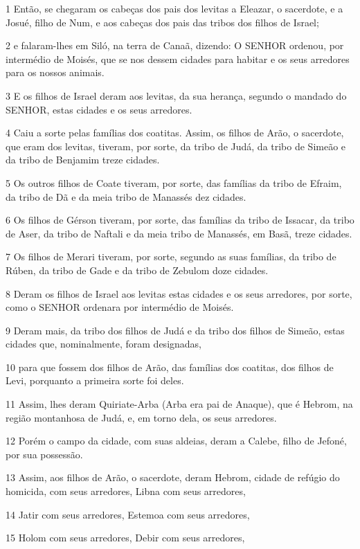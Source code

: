 \par 1 Então, se chegaram os cabeças dos pais dos levitas a Eleazar, o sacerdote, e a Josué, filho de Num, e aos cabeças dos pais das tribos dos filhos de Israel;
\par 2 e falaram-lhes em Siló, na terra de Canaã, dizendo: O SENHOR ordenou, por intermédio de Moisés, que se nos dessem cidades para habitar e os seus arredores para os nossos animais.
\par 3 E os filhos de Israel deram aos levitas, da sua herança, segundo o mandado do SENHOR, estas cidades e os seus arredores.
\par 4 Caiu a sorte pelas famílias dos coatitas. Assim, os filhos de Arão, o sacerdote, que eram dos levitas, tiveram, por sorte, da tribo de Judá, da tribo de Simeão e da tribo de Benjamim treze cidades.
\par 5 Os outros filhos de Coate tiveram, por sorte, das famílias da tribo de Efraim, da tribo de Dã e da meia tribo de Manassés dez cidades.
\par 6 Os filhos de Gérson tiveram, por sorte, das famílias da tribo de Issacar, da tribo de Aser, da tribo de Naftali e da meia tribo de Manassés, em Basã, treze cidades.
\par 7 Os filhos de Merari tiveram, por sorte, segundo as suas famílias, da tribo de Rúben, da tribo de Gade e da tribo de Zebulom doze cidades.
\par 8 Deram os filhos de Israel aos levitas estas cidades e os seus arredores, por sorte, como o SENHOR ordenara por intermédio de Moisés.
\par 9 Deram mais, da tribo dos filhos de Judá e da tribo dos filhos de Simeão, estas cidades que, nominalmente, foram designadas,
\par 10 para que fossem dos filhos de Arão, das famílias dos coatitas, dos filhos de Levi, porquanto a primeira sorte foi deles.
\par 11 Assim, lhes deram Quiriate-Arba (Arba era pai de Anaque), que é Hebrom, na região montanhosa de Judá, e, em torno dela, os seus arredores.
\par 12 Porém o campo da cidade, com suas aldeias, deram a Calebe, filho de Jefoné, por sua possessão.
\par 13 Assim, aos filhos de Arão, o sacerdote, deram Hebrom, cidade de refúgio do homicida, com seus arredores, Libna com seus arredores,
\par 14 Jatir com seus arredores, Estemoa com seus arredores,
\par 15 Holom com seus arredores, Debir com seus arredores,
